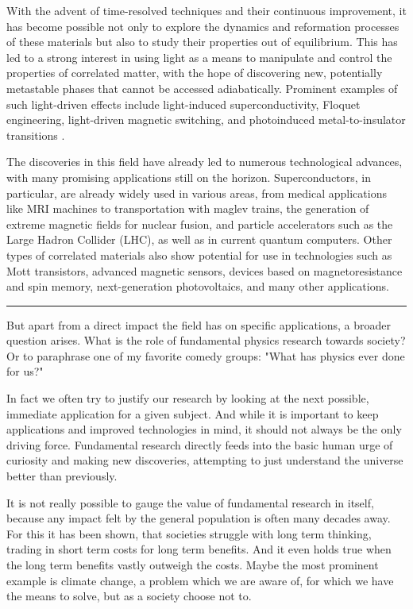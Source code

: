 With the advent of time-resolved techniques and their continuous improvement, it has become possible not only to explore the dynamics and reformation processes of these materials but also to study their properties out of equilibrium.
This has led to a strong interest in using light as a means to manipulate and control the properties of correlated matter, with the hope of discovering new, potentially metastable phases that cannot be accessed adiabatically.
Prominent examples of such light-driven effects include light-induced superconductivity, Floquet engineering, light-driven magnetic switching, and photoinduced metal-to-insulator transitions \cite{fausti_light-induced_2011,takubo_photoinduced_2008}.

The discoveries in this field have already led to numerous technological advances, with many promising applications still on the horizon.
Superconductors, in particular, are already widely used in various areas, from medical applications like MRI machines to transportation with maglev trains, the generation of extreme magnetic fields for nuclear fusion, and particle accelerators such as the Large Hadron Collider (LHC), as well as in current quantum computers.
Other types of correlated materials also show potential for use in technologies such as Mott transistors, advanced magnetic sensors, devices based on magnetoresistance and spin memory, next-generation photovoltaics, and many other applications.

\begin{center}
	\rule{0.3\textwidth}{.8pt}
\end{center}

But apart from a direct impact the field has on specific applications, a broader question arises.
What is the role of fundamental physics research towards society?
Or to paraphrase one of my favorite comedy groups: "What has physics ever done for us?"

In fact we often try to justify our research by looking at the next possible, immediate application for a given subject.
And while it is important to keep applications and improved technologies in mind, it should not always be the only driving force.
Fundamental research directly feeds into the basic human urge of curiosity and making new discoveries, attempting to just understand the universe better than previously.

It is not really possible to gauge the value of fundamental research in itself, because any impact felt by the general population is often many decades away.
For this it has been shown, that societies struggle with long term thinking, trading in short term costs for long term benefits.
And it even holds true when the long term benefits vastly outweigh the costs.
Maybe the most prominent example is climate change, a problem which we are aware of, for which we have the means to solve, but as a society choose not to.

